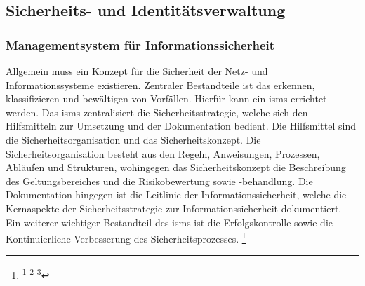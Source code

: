 \documentclass[11pt,a4paper,hidelinks]{article}   %
\begin{document}
        \subsection{Sicherheits- und Identitätsverwaltung}
            \subsubsection{Managementsystem für Informationssicherheit}
            Allgemein muss ein Konzept für die Sicherheit der Netz- und Informationssysteme existieren. Zentraler Bestandteile ist das erkennen, klassifizieren und bewältigen von Vorfällen. Hierfür kann ein \gls{isms} errichtet werden. Das \gls{isms} zentralisiert die Sicherheitsstrategie, welche sich den Hilfsmitteln zur Umsetzung und der Dokumentation bedient. Die Hilfsmittel sind die Sicherheitsorganisation und das Sicherheitskonzept. Die Sicherheitsorganisation besteht aus den Regeln, Anweisungen, Prozessen, Abläufen und Strukturen, wohingegen das Sicherheitskonzept die Beschreibung des Geltungsbereiches und die Risikobewertung sowie -behandlung. Die Dokumentation hingegen ist die Leitlinie der Informationssicherheit, welche die Kernaspekte der Sicherheitsstrategie zur Informationssicherheit dokumentiert. Ein weiterer wichtiger Bestandteil des \gls{isms} ist die Erfolgskontrolle sowie die Kontinuierliche Verbesserung des Sicherheitsprozesses.
            \footnote{
                \footcite[Vgl.][, S. 15 - 17, 18, 24 - 15 \& 33 - 34]{bsi-200-1}
                \footcite[Vgl.][, S. 9 - 10]{iso27001-2022}
                \footcite[Vgl.][, S. 47 - 50 \& 53 - 54]{9781780175188}
            }
\end{document}
